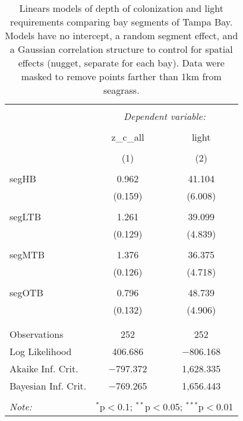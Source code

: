 \documentclass[letterpaper,12pt]{article}\usepackage[]{graphicx}\usepackage[]{color}
\begin{document}
\begin{table}[!htbp] \centering 
  \caption{Linears models of depth of colonization and light requirements comparing bay segments of Tampa Bay.  Models have no intercept, a random segment effect, and a Gaussian correlation structure to control for spatial effects (nugget, separate for each bay). Data were masked to remove points farther than 1km from seagrass.} 
  \label{} 
\begin{tabular}{@{\extracolsep{5pt}}lcc} 
\\[-1.8ex]\hline 
\hline \\[-1.8ex] 
 & \multicolumn{2}{c}{\textit{Dependent variable:}} \\ 
\cline{2-3} 
\\[-1.8ex] & z\_c\_all & light \\ 
\\[-1.8ex] & (1) & (2)\\ 
\hline \\[-1.8ex] 
 segHB & 0.962 & 41.104 \\ 
  & (0.159) & (6.008) \\ 
  & & \\ 
 segLTB & 1.261 & 39.099 \\ 
  & (0.129) & (4.839) \\ 
  & & \\ 
 segMTB & 1.376 & 36.375 \\ 
  & (0.126) & (4.718) \\ 
  & & \\ 
 segOTB & 0.796 & 48.739 \\ 
  & (0.132) & (4.906) \\ 
  & & \\ 
\hline \\[-1.8ex] 
Observations & 252 & 252 \\ 
Log Likelihood & 406.686 & $-$806.168 \\ 
Akaike Inf. Crit. & $-$797.372 & 1,628.335 \\ 
Bayesian Inf. Crit. & $-$769.265 & 1,656.443 \\ 
\hline 
\hline \\[-1.8ex] 
\textit{Note:}  & \multicolumn{2}{r}{$^{*}$p$<$0.1; $^{**}$p$<$0.05; $^{***}$p$<$0.01} \\ 
\end{tabular} 
\end{table} 
\end{document}
